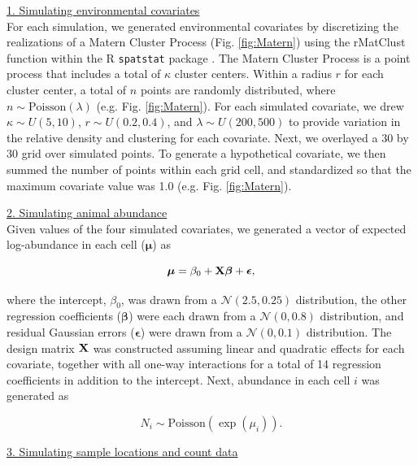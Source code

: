 \documentclass[12pt,fleqn]{article}
\begin{document}
\begin{flushleft}
\underline{1. Simulating environmental covariates} \\
For each simulation, we generated environmental covariates by discretizing the realizations of a Matern Cluster Process (Fig. \ref{fig:Matern}) using the rMatClust function within the R \texttt{spatstat} package \citep{BaddeleyTurner2005}.  The Matern Cluster Process is a point process that includes a total of $\kappa$ cluster centers.  Within a radius $r$ for each cluster center, a total of $n$ points are randomly distributed, where $n \sim \text{Poisson}(\lambda)$ (e.g. Fig. \ref{fig:Matern}).  For each simulated covariate, we drew $\kappa \sim U(5,10)$, $r \sim U(0.2,0.4)$, and $\lambda \sim U(200,500)$ to provide variation in the relative density and clustering for each covariate.  Next, we overlayed a 30 by 30 grid over simulated points.  To generate a hypothetical covariate, we then summed the number of points within each grid cell, and standardized so that the maximum covariate value was 1.0 (e.g. Fig. \ref{fig:Matern}).



\underline{2. Simulating animal abundance} \\

Given values of the four simulated covariates, we generated a vector of expected log-abundance in each cell ($\boldsymbol{\mu}$) as
\begin{linenomath}
\begin{equation*}
  \boldsymbol{\mu} = \beta_0 + {\bf X}\boldsymbol{\beta} + \boldsymbol{\epsilon},
\end{equation*}
\end{linenomath}
where the intercept, $\beta_0$, was drawn from a $\mathcal{N}(2.5,0.25)$ distribution, the other regression coefficients ($\boldsymbol{\beta}$) were each drawn from a $\mathcal{N}(0,0.8)$ distribution, and residual Gaussian errors ($\boldsymbol{\epsilon}$) were drawn from a $\mathcal{N}(0,0.1)$ distribution.  The design matrix ${\bf X}$ was constructed assuming linear and quadratic effects for each covariate, together with all one-way interactions for a total of 14 regression coefficients in addition to the intercept.
Next, abundance in each cell $i$ was generated as
\begin{linenomath}
\begin{equation*}
  N_i \sim \text{Poisson}(\exp(\mu_i)).
\end{equation*}
\end{linenomath}

\underline{3. Simulating sample locations and count data} \\


\end{flushleft}
\end{document}
